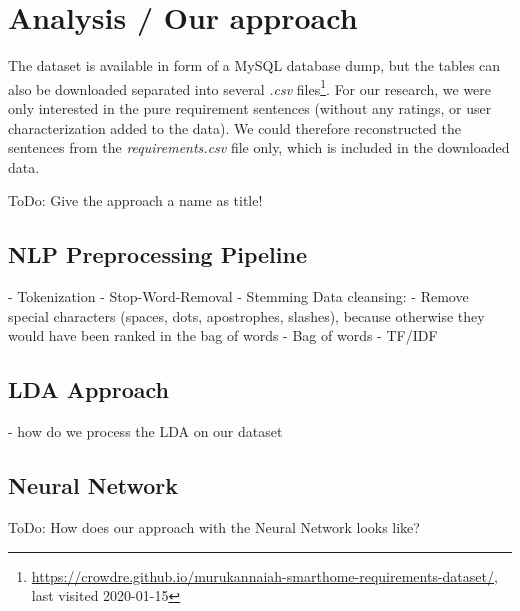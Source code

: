 \section{Analysis / Our approach} %
\label{sec:own_approach}

The \crowdre{} dataset is available in form of a MySQL database dump, but the tables can also be downloaded separated into several \textit{.csv} files\footnote{\url{https://crowdre.github.io/murukannaiah-smarthome-requirements-dataset/}, last visited 2020-01-15}. For our research, we were only interested in the pure requirement sentences (without any ratings, or user characterization added to the data). We could therefore reconstructed the sentences from the \textit{requirements.csv} file only, which is included in the downloaded data.

\colorbox{yellow!30}{ToDo:} Give the approach a name as title!

\subsection{NLP Preprocessing Pipeline} %
\label{sub:own_pipeline}

- Tokenization
- Stop-Word-Removal
- Stemming
Data cleansing:
- Remove special characters (spaces, dots, apostrophes, slashes), because otherwise they would have been ranked in the bag of words
- Bag of words
- TF/IDF

\subsection{LDA Approach} %
\label{sub:own_lda}
- how do we process the LDA on our dataset

\subsection{Neural Network} %
\label{sub:own_neuralnetwork}

\colorbox{yellow!30}{ToDo:} How does our approach with the Neural Network looks like?

